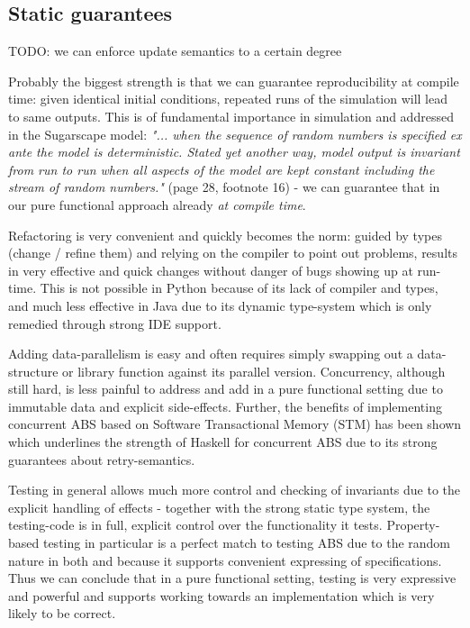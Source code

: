 \subsection{Static guarantees}
TODO: we can enforce update semantics to a certain degree

Probably the biggest strength is that we can guarantee reproducibility at compile time: given identical initial conditions, repeated runs of the simulation will lead to same outputs. This is of fundamental importance in simulation and addressed in the Sugarscape model: \textit{"... when the sequence of random numbers is specified ex ante the model is deterministic. Stated yet another way, model output is invariant from run to run when all aspects of the model are kept constant including the stream of random numbers."} (page 28, footnote 16) - we can guarantee that in our pure functional approach already \textit{at compile time}.

Refactoring is very convenient and quickly becomes the norm: guided by types (change / refine them) and relying on the compiler to point out problems, results in very effective and quick changes without danger of bugs showing up at run-time. This is not possible in Python because of its lack of compiler and types, and much less effective in Java due to its dynamic type-system which is only remedied through strong IDE support.

Adding data-parallelism is easy and often requires simply swapping out a data-structure or library function against its parallel version. Concurrency, although still hard, is less painful to address and add in a pure functional setting due to immutable data and explicit side-effects. Further, the benefits of implementing concurrent ABS based on Software Transactional Memory (STM) has been shown \cite{thaler_tale_2018} which underlines the strength of Haskell for concurrent ABS due to its strong guarantees about retry-semantics.

Testing in general allows much more control and checking of invariants due to the explicit handling of effects - together with the strong static type system, the testing-code is in full, explicit control over the functionality it tests. Property-based testing in particular is a perfect match to testing ABS due to the random nature in both and because it supports convenient expressing of specifications. Thus we can conclude that in a pure functional setting, testing is very expressive and powerful and supports working towards an implementation which is very likely to be correct.\\

